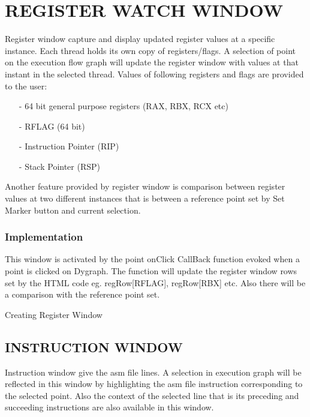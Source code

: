 \section {REGISTER WATCH WINDOW}

Register window capture and display updated register values at a specific instance. Each thread holds its own copy of registers/flags. A selection of point on the execution flow graph will update the register window with values at that instant in the selected thread. Values of following registers and flags are provided to the user:
\begin{itemize}
	\item[-] 64 bit general purpose registers (RAX, RBX, RCX etc)
	\item[-] RFLAG (64 bit)
	\item[-] Instruction Pointer (RIP)
	\item[-] Stack Pointer (RSP)
\end{itemize}

Another feature provided by register window is comparison between register values at two different instances that is between a reference point set by Set Marker button and current selection. 

\subsubsection{Implementation}

This window is activated by the point onClick CallBack function evoked when a point is clicked on Dygraph. The function will update the register window rows set by the HTML code eg. regRow[RFLAG], regRow[RBX] etc. Also there will be a comparison with the reference point set. 

\IncMargin{1em}
\begin{algorithm}[h]
\DontPrintSemicolon
{} 
\BlankLine
{}
\caption{Creating Register Window}
\end{algorithm}\DecMargin{1em}

\subsection {INSTRUCTION WINDOW}

Instruction window give the asm file lines. A selection in execution graph will be reflected in this window by highlighting the asm file instruction corresponding to the selected point. Also the context of the selected line that is its preceding and succeeding instructions are also available in this window.
